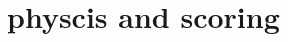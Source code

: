 \documentclass[11pt,compress,xcolor=x11names,UTF8]{beamer}
\begin{document}
\section{physcis and scoring}
\end{document}
